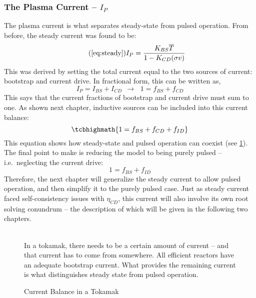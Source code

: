 \subsubsection{The Plasma Current -- $I_P$}

The plasma current is what separates steady-state from pulsed operation. From before, the steady current was found to be:
\begin{equation}
	\tag{\ref{eq:steady}}
	I_P = \frac{K_{BS} \overline T}{1 - K_{CD} ( \sigma v ) }
\end{equation}
This was derived by setting the total current equal to the two sources of current: bootstrap and current drive. In fractional form, this can be written as,
\begin{equation}
	I_P = I_{BS} + I_{CD} \ \ \rightarrow \, \ \ 1 = f_{BS} + f_{CD}
\end{equation}
This says that the current fractions of bootstrap and current drive must sum to one. As shown next chapter, inductive sources can be included into this current balance:
\begin{equation}
	\label{eq:ifbal}
	\tcbhighmath{
	1 = f_{BS} + f_{CD} + f_{ID}
	}
\end{equation}
This equation shows how steady-state and pulsed operation can coexist (see \cref{fig:curbal}). The final point to make is reducing the model to being purely pulsed -- i.e.\ neglecting the current drive:
\begin{equation}
	1 = f_{BS} + f_{ID}
\end{equation}
Therefore, the next chapter will generalize the steady current to allow pulsed operation, and then simplify it to the purely pulsed case. Just as steady current faced self-consistency issues with $\eta_{CD}$, this current will also involve its own root solving conundrum -- the description of which will be given in the following two chapters.
\begin{figure}
	\centering
	\begin{adjustbox}{width=0.75\textwidth}
		
	\end{adjustbox}
	\caption{Current Balance in a Tokamak} ~\\
	\small In a tokamak, there needs to be a certain amount of current -- and that current has to come from somewhere. All efficient reactors have an adequate bootstrap current. What provides the remaining current is what distinguishes steady state from pulsed operation.
	\label{fig:curbal}
\end{figure}


